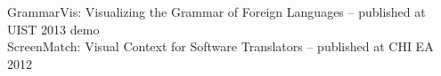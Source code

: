 \documentclass[margin,line]{resume}
\begin{document}
\begin{resume}
GrammarVis: Visualizing the Grammar of Foreign Languages -- published at UIST 2013 demo\\ %
ScreenMatch: Visual Context for Software Translators -- published at CHI EA 2012\\ %

\vspace{-3mm}




\end{resume}
\end{document}
